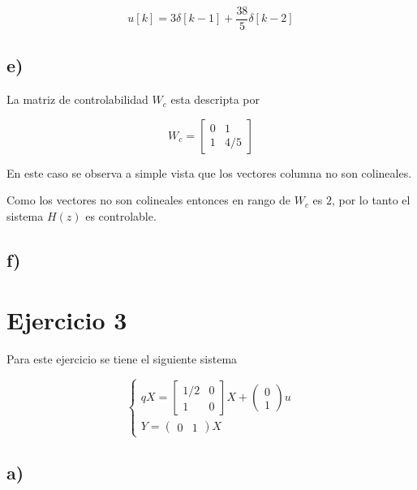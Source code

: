 \documentclass[11pt,a4paper]{article}
\newcommand{\siseq}[1]{ \left\{ \begin{array}{c}
    #1
\end{array} \right. }
\begin{document}
    \begin{equation}
        u[k] = 3\delta[k-1] + \frac{38}{5} \delta[k-2]
    \end{equation}

    \subsection*{e)}
        La matriz de controlabilidad $W_c$ esta descripta por 
        
        \begin{equation}
            W_c = 
            \begin{bmatrix}
                0 & 1 \\
                1 & 4/5
            \end{bmatrix}
        \end{equation}

        En este caso se observa a simple vista que los vectores columna no son colineales.

        Como los vectores no son colineales entonces en rango de $W_c$ es $2$, por lo tanto el sistema 
        $H(z)$ es controlable.
    \subsection*{f)}

    \section*{Ejercicio 3}

    Para este ejercicio se tiene el siguiente sistema 

    \begin{equation}
        \siseq{
            qX = 
            \begin{bmatrix}
                1/2 & 0 \\ 
                1 & 0
            \end{bmatrix} X
            + 
            \begin{pmatrix}
                0 \\ 1
            \end{pmatrix}u \\ 
            Y = 
            \begin{pmatrix}
                0 & 1
            \end{pmatrix}X
        }
    \end{equation}

    \subsection*{a)}
\end{document}
